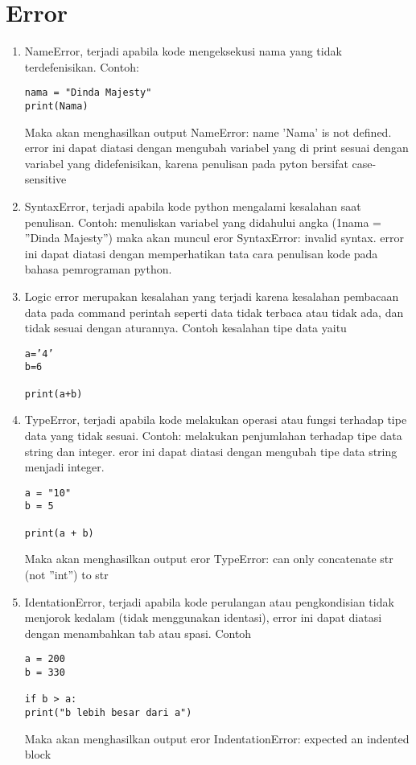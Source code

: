 \section{Error}
\begin{enumerate}
\item NameError, terjadi apabila kode mengeksekusi nama yang tidak terdefenisikan. Contoh:
\begin{lstlisting}
nama = "Dinda Majesty"
print(Nama)
\end{lstlisting}

Maka akan menghasilkan output NameError: name ’Nama’ is not deﬁned. error ini dapat diatasi dengan mengubah variabel yang di print sesuai dengan variabel yang didefenisikan, karena penulisan pada pyton bersifat case-sensitive

\item SyntaxError, terjadi apabila kode python mengalami kesalahan saat penulisan. Contoh: menuliskan variabel yang didahului angka (1nama = ”Dinda Majesty”) maka akan muncul eror SyntaxError: invalid syntax. error ini dapat diatasi dengan memperhatikan tata cara penulisan kode pada bahasa pemrograman python.

\item Logic error merupakan kesalahan yang terjadi karena kesalahan pembacaan data pada command perintah seperti data tidak terbaca atau tidak ada, dan tidak sesuai dengan aturannya. Contoh kesalahan tipe data yaitu 
\begin{lstlisting}
a=’4’ 
b=6 

print(a+b)
\end{lstlisting}


\item TypeError, terjadi apabila kode melakukan operasi atau fungsi terhadap tipe data yang tidak sesuai. Contoh: melakukan penjumlahan terhadap tipe data string dan integer. eror ini dapat diatasi dengan mengubah tipe data string menjadi integer.
\begin{lstlisting}
a = "10"
b = 5

print(a + b)
\end{lstlisting}
Maka akan menghasilkan output eror TypeError: can only concatenate str (not ”int”) to str

\item IdentationError, terjadi apabila kode perulangan atau pengkondisian tidak menjorok kedalam (tidak menggunakan identasi), error ini dapat diatasi dengan menambahkan tab atau spasi. Contoh
\begin{lstlisting}
a = 200 
b = 330 

if b > a: 
print("b lebih besar dari a")
\end{lstlisting}
Maka akan menghasilkan output eror IndentationError: expected an indented block
\end{enumerate}

